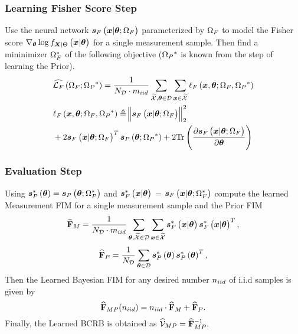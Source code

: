 {\subsubsection{\textbf{Learning Fisher Score Step}} 
{Use the neural network $\bm{s}_{F}\left({\bm{x}}|\bm{\theta};\Omega_{F}\right)$ parameterized by $\Omega_{F}$ to %
model {the Fisher score} $\nabla_{\p}\log\probt{\x|\p}{\X|\pr}$ {for a single measurement sample.}
Then %
{find a mininimizer $\Omega_{F}^*$}
of the following objective 
($\paramp%
{^*}$ is known from the step of learning the Prior).
\begin{align}\label{eq:score_lik_mean}
    &\lossfsm\brackets{\paramf; \paramp%
    {^*}}=\frac{1}{\nds\cdot\niiddata}\sum_{\xsetr,\p\in\mathcal{D}}\sum_{{\x}\in\xsetr}{\ell_{F}\brackets{\x,\p;\paramf,\paramp%
    {^*}}}{} \nonumber\\
    &\ell_{F}\brackets{\x,\p;\paramf,\paramp%
    {^*}}\triangleq \norm{\lscore{{\x}}{\p;\paramf}}_2^2\\
    &+2\lscore{{\x}}{\p;\paramf}^T\priorscore{\p;\paramp%
    {^*}}+2\trace{\frac{\partial \lscore{{\x}}{\p;\paramf}}{\partial\p}}\nonumber
\end{align}
\subsubsection{\textbf{Evaluation Step}}  %
{Using $\bm{s}_{P}^*\left(\bm{\theta}\right)=\bm{s}_{P}\left(\bm{\theta}; \Omega^*_P\right)$ and $\bm{s}_{F}^*\left(\bm{x}|\bm{\theta}\right)$ = $\bm{s}_{F}\left(\bm{x}|\bm{\theta};\Omega^*_F\right)$ } compute %
{the learned Measurement {FIM for a single measurement sample} and the Prior FIM}
\begin{equation} \label{eq:mean_efim_likd}
    \widehat{\mathbf{F}}_{M}=\frac{1}{N_{\mathcal{D}}\cdot m_{iid}}\sum_{\bm{\theta},\widetilde{\mathcal{X}}\in\mathcal{D}} \sum_{\bm{x}\in\widetilde{\mathcal{X}}}\bm{s}_{F}^*\left(\bm{x}|\bm{\theta}\right)\bm{s}_{F}^*\left(\bm{x}|\bm{\theta}\right)^T,
\end{equation}
\begin{equation}\label{eq:bprior_mean}
    \widehat{\mathbf{F}}_{P}=\frac{1}{N_{\mathcal{D}}} \sum_{\bm{\theta}\in\mathcal{D}} \bm{s}_{P}^*\left(\bm{\theta}\right)\bm{s}_{P}^*\left(\bm{\theta}\right)^T,
\end{equation}
{Then}
the Learned Bayesian FIM for any desired number $n_{iid}$ of i.i.d samples is given by
\begin{equation}\label{eq:bfim_apx_final}
     \widehat{\mathbf{F}}_{MP}{(n_{iid})} =n_{iid}\cdot  \widehat{\mathbf{F}}_{M}+ \widehat{\mathbf{F}}_{P}.
\end{equation}
Finally, %
{%
the Learned BCRB 
is obtained as }
    $\widehat{\mathcal{V}}_{MP}=\widehat{\mathbf{F}}_{MP}^{-1}.$   
    
}}
